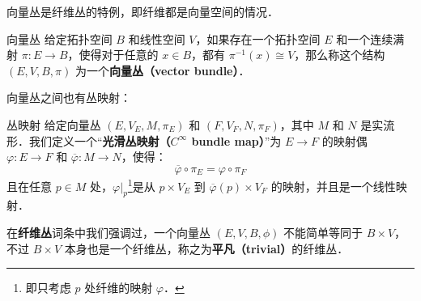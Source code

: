 
向量丛是纤维丛的特例，即纤维都是向量空间的情况．

\begin{definition}{向量丛}
给定拓扑空间 $B$ 和线性空间 $V$，如果存在一个拓扑空间 $E$ 和一个连续满射 $\pi:E\rightarrow B$，使得对于任意的 $x\in B$，都有 $\pi^{-1}(x)\cong V$，那么称这个结构 $(E, V, B, \pi)$ 为一个\textbf{向量丛（vector bundle）}．
\end{definition}

向量丛之间也有丛映射：

\begin{definition}{丛映射}
给定向量丛 $(E, V_E, M, \pi_E)$ 和 $(F, V_F, N, \pi_F)$，其中 $M$ 和 $N$ 是实流形．我们定义一个“\textbf{光滑丛映射（$C^\infty$ bundle map）}”为 $E\rightarrow F$ 的映射偶 $\varphi: E\rightarrow F$ 和 $\overline{\varphi}: M\rightarrow N$，使得：
\begin{equation}
\overline{\varphi}\circ\pi_E=\varphi\circ\pi_F
\end{equation}
且在任意 $p\in M$ 处，$\varphi|_p$\footnote{即只考虑 $p$ 处纤维的映射 $\varphi$．}是从 $p\times V_E$ 到 $\overline{\varphi}(p)\times V_F$ 的映射，并且是一个线性映射．
\end{definition}

在\textbf{纤维丛}词条中我们强调过，一个向量丛 $(E, V, B, \phi)$ 不能简单等同于 $B\times V$，不过 $B\times V$ 本身也是一个纤维丛，称之为\textbf{平凡（trivial）}的纤维丛．




